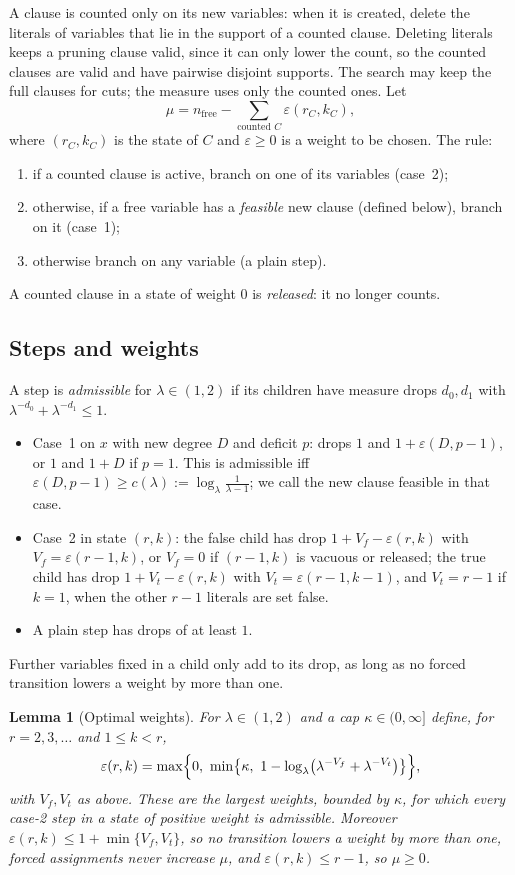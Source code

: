 \documentclass[11pt,a4paper]{article}
\newtheorem{lemma}[theorem]{Lemma}
\theoremstyle{remark}
\newcommand{\nfree}{n_{\mathrm{free}}}
\begin{document}
A clause is counted only on its new variables: when it is created, delete the
literals of variables that lie in the support of a counted clause. Deleting
literals keeps a pruning clause valid, since it can only lower the count, so
the counted clauses are valid and have pairwise disjoint supports. The search
may keep the full clauses for cuts; the measure uses only the counted ones. Let
\[
 \mu=\nfree-\sum_{\text{counted }C}\varepsilon(r_C,k_C),
\]
where $(r_C,k_C)$ is the state of $C$ and $\varepsilon\ge0$ is a weight to be
chosen. The rule:
\begin{enumerate}
 \item if a counted clause is active, branch on one of its variables
 (case~2);
 \item otherwise, if a free variable has a \emph{feasible} new clause (defined
 below), branch on it (case~1);
 \item otherwise branch on any variable (a plain step).
\end{enumerate}
A counted clause in a state of weight $0$ is \emph{released}: it no longer
counts.

\subsection{Steps and weights}

A step is \emph{admissible} for $\lambda\in(1,2)$ if its children have measure
drops $d_0,d_1$ with $\lambda^{-d_0}+\lambda^{-d_1}\le1$.
\begin{itemize}
 \item Case~1 on $x$ with new degree $D$ and deficit $p$: drops $1$ and
 $1+\varepsilon(D,p-1)$, or $1$ and $1+D$ if $p=1$. This is admissible iff
 $\varepsilon(D,p-1)\ge c(\lambda):=\log_\lambda\frac1{\lambda-1}$; we call
 the new clause feasible in that case.
 \item Case~2 in state $(r,k)$: the false child has drop
 $1+V_f-\varepsilon(r,k)$ with $V_f=\varepsilon(r-1,k)$, or $V_f=0$ if
 $(r-1,k)$ is vacuous or released; the true child has drop
 $1+V_t-\varepsilon(r,k)$ with $V_t=\varepsilon(r-1,k-1)$, and $V_t=r-1$ if
 $k=1$, when the other $r-1$ literals are set false.
 \item A plain step has drops of at least $1$.
\end{itemize}
Further variables fixed in a child only add to its drop, as long as no forced
transition lowers a weight by more than one.

\begin{lemma}[Optimal weights]\label{lem:weights}
For $\lambda\in(1,2)$ and a cap $\kappa\in(0,\infty]$ define, for $r=2,3,\dots$
and $1\le k<r$,
\[
 \varepsilon(r,k)=\max\Bigl\{0,\ \min\bigl\{\kappa,\
 1-\log_\lambda\bigl(\lambda^{-V_f}+\lambda^{-V_t}\bigr)\bigr\}\Bigr\},
\]
with $V_f,V_t$ as above. These are the largest weights, bounded by $\kappa$,
for which every case-2 step in a state of positive weight is admissible.
Moreover $\varepsilon(r,k)\le1+\min\{V_f,V_t\}$, so no transition lowers a
weight by more than one, forced assignments never increase $\mu$, and
$\varepsilon(r,k)\le r-1$, so $\mu\ge0$.
\end{lemma}
\end{document}
